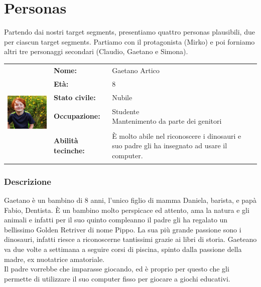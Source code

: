\documentclass[../Report.tex]{subfiles}
\begin{document}
    \section{Personas}
    \label{section: personas}
    Partendo dai nostri target segments, presentiamo quattro personas plausibili, due per ciascun target segments. Partiamo con il protagonista (Mirko) e poi forniamo altri tre personaggi secondari (Claudio, Gaetano e Simona).\\

    \begin{table}[H]
        \begin{tabular}{|c|l|p{7cm}|}
            \hline
            \multirow{5}{*}{\includegraphics[width=5cm, height=5cm]{Gaetano.jpg}} 
                & \textbf{Nome:} & Gaetano Artico\\ \cmidrule{2-3}
            & \textbf{Età:} & 8 \\ \cmidrule{2-3}
            & \textbf{Stato civile:} & Nubile \\ \cmidrule{2-3}
            & \textbf{Occupazione:} & \makecell{Studente \\ Mantenimento da parte dei genitori} \\ \cmidrule{2-3}
            & \textbf{Abilità tecinche:} &  È molto abile nel riconoscere i dinosauri e suo padre gli ha insegnato ad usare il computer.\\
            \hline
        \end{tabular}
    \end{table}

    \subsubsection{Descrizione}
    Gaetano è un bambino di 8 anni, l'unico figlio di mamma Daniela, barista, e papà Fabio, Dentista. È un bambino molto perspicace ed attento, ama la natura e gli animali e infatti per il suo quinto compleanno il padre gli ha regalato un bellissimo Golden Retriver di nome Pippo. La sua più grande passione sono i dinosauri, infatti riesce a riconoscerne tantissimi grazie ai libri di storia.
    Gaeteano va due volte a settimana a seguire corsi di piscina, spinto dalla passione della madre, ex nuotatrice amatoriale.\\
    Il padre vorrebbe che imparasse giocando, ed è proprio per questo che gli permette di utilizzare il suo computer fisso per giocare a giochi educativi.
\end{document}
